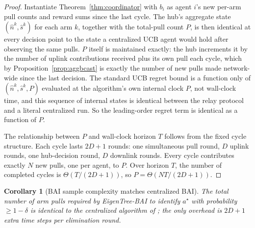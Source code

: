 \documentclass[letterpaper]{article} %
\newtheorem{corollary}{Corollary}
\begin{document}
\begin{proof}
Instantiate Theorem~\ref{thm:coordinator} with $b_i$ as agent $i$'s new
per-arm pull counts and reward sums since the last cycle. The hub's
aggregate state $(\hat n^k, \hat s^k)$ for each arm $k$, together with the
total-pull count $P$, is then identical at every decision point to the
state a centralized UCB agent would hold after observing the same pulls.
$P$ itself is maintained exactly: the hub increments it by the number of
uplink contributions received plus its own pull each cycle, which by
Proposition~\ref{prop:aggbcast} is exactly the number of new pulls made
network-wide since the last decision. The standard UCB regret bound is a
function only of $(\hat n^k,\hat s^k,P)$ evaluated at the algorithm's own
internal clock $P$, not wall-clock time, and this sequence of internal
states is identical between the relay protocol and a literal centralized
run. So the leading-order regret term is identical as a function of $P$.

The relationship between $P$ and wall-clock horizon $T$ follows from the
fixed cycle structure. Each cycle lasts $2D+1$ rounds: one simultaneous
pull round, $D$ uplink rounds, one hub-decision round, $D$ downlink
rounds. Every cycle contributes exactly $N$ new pulls, one per agent, to
$P$. Over horizon $T$, the number of completed cycles is
$\Theta(T/(2D+1))$, so $P = \Theta(NT/(2D+1))$.
\end{proof}

\begin{corollary}[BAI sample complexity matches centralized BAI]
\label{cor:bai}
The total number of arm pulls required by EigenTree-BAI to identify $a^\star$ with probability $\geq 1-\delta$ is identical to the centralized algorithm of \citet{hillel2013distributed}; the only overhead is $2D+1$ extra time steps per elimination round.
\end{corollary}
\end{document}
